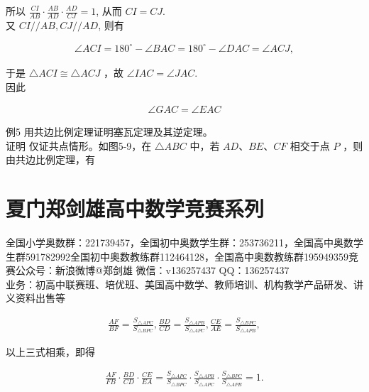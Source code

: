 \documentclass[10pt]{article}
\begin{document}
所以 $\frac{C I}{A B} \cdot \frac{A B}{A D} \cdot \frac{A D}{C J}=1$, 从而 $C I=C J$.\\
又 $C I / / A B, C J / / A D$, 则有

\begin{align*}
\angle A C I=180^{\circ}-\angle B A C=180^{\circ}-\angle D A C=\angle A C J,
\end{align*}

于是 $\triangle A C I \cong \triangle A C J$ ，故 $\angle I A C=\angle J A C$.\\
因此

\begin{align*}
\angle G A C=\angle E A C
\end{align*}

例5 用共边比例定理证明塞瓦定理及其逆定理。\\
证明 仅证共点情形。如图5-9，在 $\triangle A B C$ 中，若 $A D 、 B E 、 C F$ 相交于点 $P$ ，则由共边比例定理，有

\section*{夏门郑剑雄高中数学竞赛系列}
全国小学奥数群：221739457，全国初中奥数学生群：253736211，全国高中奥数学生群591782992全国初中奥数教练群112464128，全国高中奥数教练群195949359竞赛公众号：新浪微博@郑剑雄 微信：v136257437 QQ：136257437\\
业务：初高中联赛班、培优班、美国高中数学、教师培训、机构教学产品研发、讲义资料出售等

\begin{align*}
\frac{A F}{B F}=\frac{S_{\triangle A P C}}{S_{\triangle B P C}}, \frac{B D}{C D}=\frac{S_{\triangle A P B}}{S_{\triangle A P C}}, \frac{C E}{A E}=\frac{S_{\triangle B P C}}{S_{\triangle A P B}},
\end{align*}

以上三式相乘，即得

\begin{align*}
\frac{A F}{F B} \cdot \frac{B D}{C D} \cdot \frac{C E}{E A}=\frac{S_{\triangle A P C}}{S_{\triangle B P C}} \cdot \frac{S_{\triangle A P B}}{S_{\triangle A P C}} \cdot \frac{S_{\triangle B P C}}{S_{\triangle A P B}}=1 .
\end{align*}
\end{document}
